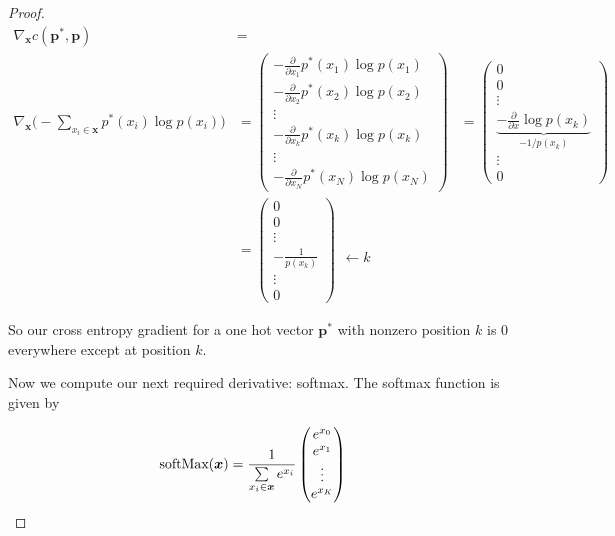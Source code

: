 \documentclass[11pt]{article}
\newcommand{\pd}{\partial}
\newcommand{\bs}{\boldsymbol}
\begin{document}
\begin{proof}
	\begin{align}
		\nabla_{\bs{x}}c(\bs{p}^*, \bs{p})
 		&=\\
		\nabla_{\bs{x}}\bigg(-\sum_{x_i\in\bs{x}} p^*(x_i) \log p(x_i)\bigg)
 		&=
		\begin{pmatrix}
			-\frac{\pd}{\pd x_1} p^*(x_1) \log p(x_1)\\
			-\frac{\pd}{\pd x_2} p^*(x_2) \log p(x_2)\\
			\vdots \\
			-\frac{\pd}{\pd x_k} p^*(x_k) \log p(x_k)\\
			\vdots \\
			-\frac{\pd}{\pd x_N} p^*(x_N) \log p(x_N)
		\end{pmatrix}
		&=
		\begin{pmatrix}
			0 \\
			0 \\
			\vdots \\
			\underbrace{-\frac{\pd}{\pd x} \log p(x_k)}_{-1 / p(x_k)} \\
			\vdots \\
			0
		\end{pmatrix}
		\\ &=
		\begin{pmatrix}
			0 \\
			0 \\
			\vdots \\
			-\frac{1}{p(x_k)} \\
			\vdots \\
			0
		\end{pmatrix}
		\begin{matrix}
			\phantom{0} \\
			\phantom{0} \\
			\phantom{\vdots} \\
			\leftarrow k \phantom{\frac{1}{1}} \\
			\phantom{\vdots} \\
			\phantom{0}
		\end{matrix}
	\end{align}

	So our cross entropy gradient for a one hot vector $\bs{p}^*$ with nonzero
	position $k$ is $0$ everywhere except at position $k$.
	\newline

	Now we compute our next required derivative: softmax.
	The softmax function is given by

	\begin{align}
		\text{softMax}(\boldsymbol{x})
		&=
		\frac{1}{
			\Sum_{x_i\in\bs{x}}e^{x_i}
		}
		\begin{pmatrix}
			e^{x_0} \\
			e^{x_1} \\
			\vdots \\
			e^{x_K}
		\end{pmatrix}
	\end{align}


\end{proof}
\end{document}
